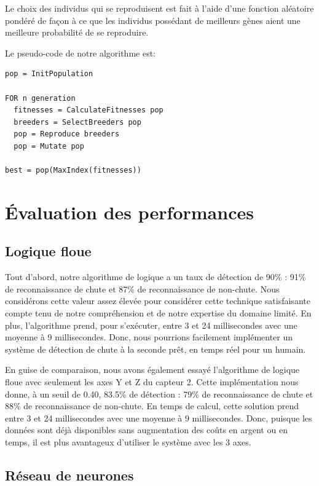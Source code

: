 \documentclass[12pt,letterpaper]{article}
\begin{document}
Le choix des individus qui se reproduisent est fait à l'aide d'une fonction aléatoire pondéré de façon à ce que les individus possédant
de meilleurs gènes aient une meilleure probabilité de se reproduire.

Le pseudo-code de notre algorithme est:

\begin{verbatim}
pop = InitPopulation

FOR n generation
  fitnesses = CalculateFitnesses pop
  breeders = SelectBreeders pop
  pop = Reproduce breeders
  pop = Mutate pop

best = pop(MaxIndex(fitnesses))

\end{verbatim}


\section{Évaluation des performances}

\subsection{Logique floue}

Tout d'abord, notre algorithme de logique a un taux de détection de 90\% : 91\% de reconnaissance de chute et 87\% de reconnaissance de non-chute. Nous considérons cette valeur assez élevée pour considérer cette technique satisfaisante compte tenu de notre compréhension et de notre expertise du domaine limité. En plus, l'algorithme prend, pour s'exécuter, entre 3 et 24 millisecondes avec une moyenne à 9 millisecondes. Donc, nous pourrions facilement implémenter un système de détection de chute à la seconde prêt, en temps réel pour un humain.

En guise de comparaison, nous avons également essayé l'algorithme de logique floue avec seulement les axes Y et Z du capteur 2. Cette implémentation nous donne, à un seuil de 0.40, 83.5\% de détection : 79\% de reconnaissance de chute et 88\% de reconnaissance de non-chute. En temps de calcul, cette solution prend entre 3 et 24 millisecondes avec une moyenne à 9 millisecondes. Donc, puisque les données sont déjà disponibles sans augmentation des coûts en argent ou en temps, il est plus avantageux d'utiliser le système avec les 3 axes.

\subsection{Réseau de neurones} %
\end{document}
